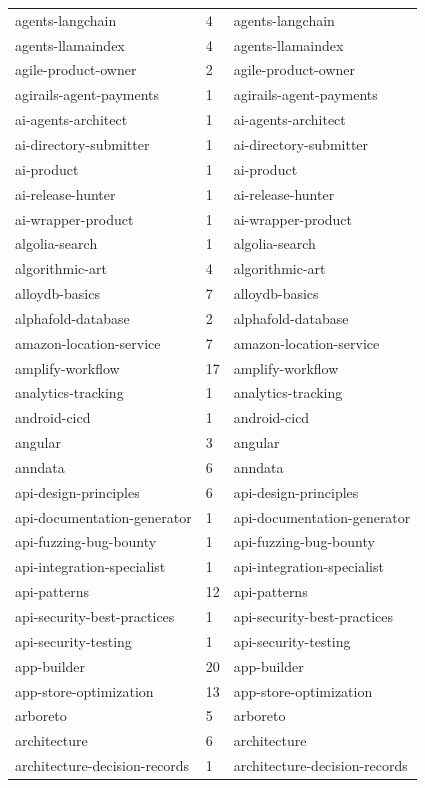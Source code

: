 \begin{longtable}{@{}lll@{}}
agents-langchain & 4 & agents-langchain\\
agents-llamaindex & 4 & agents-llamaindex\\
agile-product-owner & 2 & agile-product-owner\\
agirails-agent-payments & 1 & agirails-agent-payments\\
ai-agents-architect & 1 & ai-agents-architect\\
ai-directory-submitter & 1 & ai-directory-submitter\\
ai-product & 1 & ai-product\\
ai-release-hunter & 1 & ai-release-hunter\\
ai-wrapper-product & 1 & ai-wrapper-product\\
algolia-search & 1 & algolia-search\\
algorithmic-art & 4 & algorithmic-art\\
alloydb-basics & 7 & alloydb-basics\\
alphafold-database & 2 & alphafold-database\\
amazon-location-service & 7 & amazon-location-service\\
amplify-workflow & 17 & amplify-workflow\\
analytics-tracking & 1 & analytics-tracking\\
android-cicd & 1 & android-cicd\\
angular & 3 & angular\\
anndata & 6 & anndata\\
api-design-principles & 6 & api-design-principles\\
api-documentation-generator & 1 & api-documentation-generator\\
api-fuzzing-bug-bounty & 1 & api-fuzzing-bug-bounty\\
api-integration-specialist & 1 & api-integration-specialist\\
api-patterns & 12 & api-patterns\\
api-security-best-practices & 1 & api-security-best-practices\\
api-security-testing & 1 & api-security-testing\\
app-builder & 20 & app-builder\\
app-store-optimization & 13 & app-store-optimization\\
arboreto & 5 & arboreto\\
architecture & 6 & architecture\\
architecture-decision-records & 1 & architecture-decision-records\\

\end{longtable}
